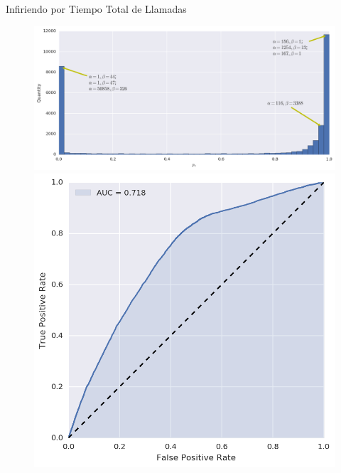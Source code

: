 \documentclass{beamer}
\begin{document}
\begin{frame}{Infiriendo por Tiempo Total de Llamadas}

	\begin{figure}
		\includegraphics[width=\framewidth, height=.37\textheight, keepaspectratio]{figures/bayes/hist_time.png} \\
		\includegraphics[width=.49\framewidth, height=.37\textheight, keepaspectratio]{figures/bayes/roc_time.png}

\end{figure}
\end{frame}
\end{document}
